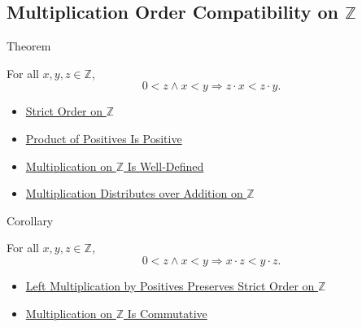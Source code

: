 \subsection*{\texorpdfstring{Multiplication Order Compatibility on $\mathbb{Z}$}{Multiplication Order Compatibility on Z}}

\begin{theorembox}{Theorem}
\begin{theorem}
\label{thm:left-positive-multiplication-preserves-strict-order-on-z}
For all $x,y,z\in\mathbb{Z}$,
\[
0<z\land x<y \Longrightarrow z\cdot x<z\cdot y.
\]
\end{theorem}
\end{theorembox}

\begin{dependencies}
\begin{itemize}
  \item \hyperref[def:strict-order-on-z]{Strict Order on $\mathbb{Z}$}
  \item \hyperref[prop:product-of-positives-is-positive]{Product of Positives Is Positive}
  \item \hyperref[thm:multiplication-on-z-well-defined]{Multiplication on $\mathbb{Z}$ Is Well-Defined}
  \item \hyperref[thm:multiplication-distributes-over-addition-on-z]{Multiplication Distributes over Addition on $\mathbb{Z}$}
\end{itemize}
\end{dependencies}

\begin{corollarybox}{Corollary}
\begin{corollary}
\label{cor:right-positive-multiplication-preserves-strict-order-on-z}
For all $x,y,z\in\mathbb{Z}$,
\[
0<z\land x<y \Longrightarrow x\cdot z<y\cdot z.
\]
\end{corollary}
\end{corollarybox}

\begin{dependencies}
\begin{itemize}
  \item \hyperref[thm:left-positive-multiplication-preserves-strict-order-on-z]{Left Multiplication by Positives Preserves Strict Order on $\mathbb{Z}$}
  \item \hyperref[thm:multiplication-on-z-commutative]{Multiplication on $\mathbb{Z}$ Is Commutative}
\end{itemize}
\end{dependencies}

